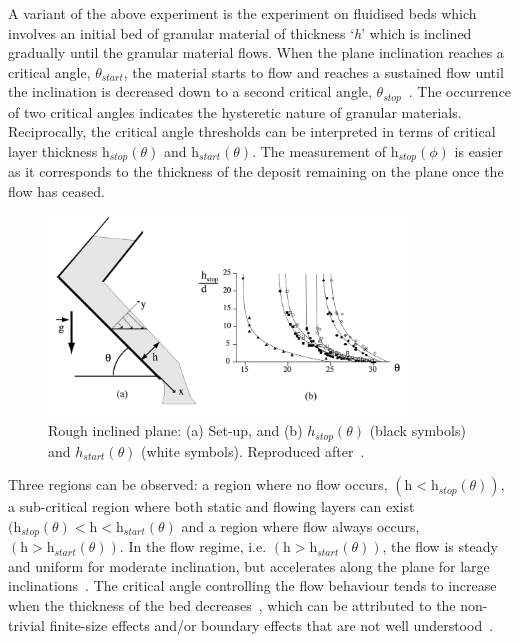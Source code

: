 A variant of the above experiment is the experiment on fluidised beds 
which involves an initial bed of granular material of thickness `\textit{h}' 
which is inclined gradually until the granular material flows. When the plane 
inclination reaches a critical angle, $\theta_{\textit{start}}$, the material 
starts to flow and reaches a sustained flow until the inclination is decreased 
down to a second critical angle, $\theta_{\textit{stop}}$~\citep{Midi2004}. The 
occurrence of two critical angles indicates the hysteretic nature of granular 
materials. Reciprocally, the critical angle thresholds can be interpreted in 
terms of critical layer thickness $\textit{h}_{\textit{stop}}(\theta)$ and 
$\textit{h}_{\textit{start}}(\theta)$. The measurement of  
$\textit{h}_{\textit{stop}}(\phi)$ is easier as it corresponds to the thickness 
of the deposit remaining on the plane once the flow has ceased. 

\begin{figure}[tbhp]
\centering
\includegraphics[width=0.85\textwidth]{Incline}
\caption{Rough inclined plane: (a) Set-up, and (b) $h_{stop}(\theta)$ (black 
symbols) and $h_{start}(\theta)$ (white symbols). Reproduced 
after~\citet{Midi2004}.}
\label{fig:Incline}
\end{figure}


Three regions can be observed: a region where no flow occurs, 
$(\textit{h}<\textit{h}_{\textit{stop}}(\theta))$, a sub-critical region where 
both static and flowing layers can exist $(\textit{h}_{\textit{stop}}(\theta) < 
\textit{h} < \textit{h}_{\textit{start}}(\theta)$ and a region where flow 
always occurs, $(\textit{h}>\textit{h}_{\textit{start}}(\theta))$. In the flow 
regime, i.e. $(\textit{h}>\textit{h}_{\textit{start}}(\theta))$, the flow is 
steady and uniform for moderate inclination, but accelerates along the plane 
for large inclinations~\citep{Midi2004}. The critical angle controlling the 
flow behaviour tends to increase when the thickness of the bed 
decreases~\citep{Pouliquen2002a,Daerr1999}, which can be attributed to the 
non-trivial finite-size effects and/or boundary effects that are not well 
understood~\citep{Forterre2008}. 

